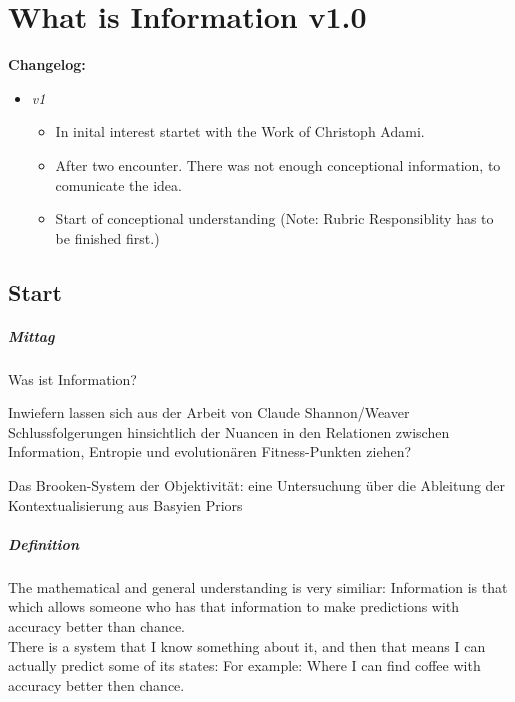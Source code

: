 \chapter{What is Information v1.0}
\setcounter{section}{0}

\textbf{Changelog:}\\
\begin{itemize}
	\item \textit{v1} 
	\begin{itemize}
		\item In inital interest startet with the Work of Christoph Adami.
		\item After two encounter. There was not enough conceptional information, to comunicate the idea.
		\item Start of conceptional understanding (Note: Rubric Responsiblity has to be finished first.)
	\end{itemize}
\end{itemize}

\section{Start}

\paragraph{Mittag}
Was ist Information?

Inwiefern lassen sich aus der Arbeit von Claude Shannon/Weaver Schlussfolgerungen hinsichtlich der Nuancen in den Relationen zwischen Information, Entropie und evolutionären Fitness-Punkten ziehen?


Das Brooken-System der Objektivität: eine Untersuchung über die Ableitung der Kontextualisierung aus Basyien Priors

\paragraph{Definition}
The mathematical and general understanding is very similiar: 
Information is that which allows someone who has that information to make predictions with accuracy better than chance.\\

There is a system that I know something about it, and then that means I can actually predict some of its states: For example: Where I can find coffee with accuracy better then chance.
